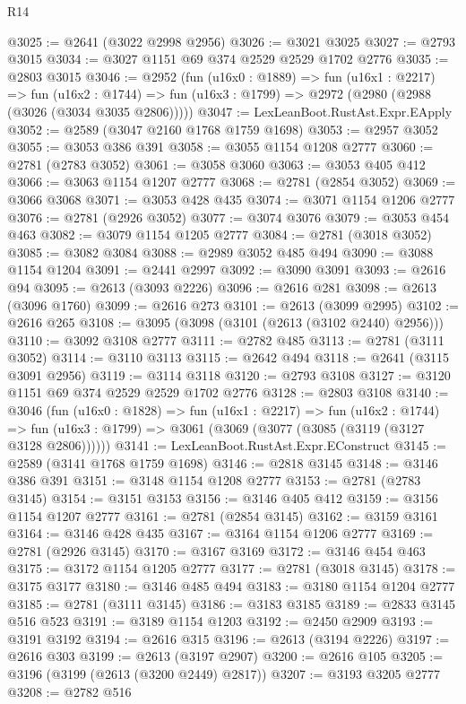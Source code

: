 \begin{lexlean}{R14}
\begin{coremodule}
@3025 := @2641 (@3022 @2998 @2956)
@3026 := @3021 @3025
@3027 := @2793 @3015
@3034 := @3027 @1151 @69 @374 @2529 @2529 @1702 @2776
@3035 := @2803 @3015
@3046 := @2952
    (fun (u16x0 : @1889) =>
    fun (u16x1 : @2217) =>
    fun (u16x2 : @1744) => fun (u16x3 : @1799) => @2972 (@2980 (@2988 (@3026 (@3034 @3035 @2806)))))
@3047 := LexLeanBoot.RustAst.Expr.EApply
@3052 := @2589 (@3047 @2160 @1768 @1759 @1698)
@3053 := @2957 @3052
@3055 := @3053 @386 @391
@3058 := @3055 @1154 @1208 @2777
@3060 := @2781 (@2783 @3052)
@3061 := @3058 @3060
@3063 := @3053 @405 @412
@3066 := @3063 @1154 @1207 @2777
@3068 := @2781 (@2854 @3052)
@3069 := @3066 @3068
@3071 := @3053 @428 @435
@3074 := @3071 @1154 @1206 @2777
@3076 := @2781 (@2926 @3052)
@3077 := @3074 @3076
@3079 := @3053 @454 @463
@3082 := @3079 @1154 @1205 @2777
@3084 := @2781 (@3018 @3052)
@3085 := @3082 @3084
@3088 := @2989 @3052 @485 @494
@3090 := @3088 @1154 @1204
@3091 := @2441 @2997
@3092 := @3090 @3091
@3093 := @2616 @94
@3095 := @2613 (@3093 @2226)
@3096 := @2616 @281
@3098 := @2613 (@3096 @1760)
@3099 := @2616 @273
@3101 := @2613 (@3099 @2995)
@3102 := @2616 @265
@3108 := @3095 (@3098 (@3101 (@2613 (@3102 @2440) @2956)))
@3110 := @3092 @3108 @2777
@3111 := @2782 @485
@3113 := @2781 (@3111 @3052)
@3114 := @3110 @3113
@3115 := @2642 @494
@3118 := @2641 (@3115 @3091 @2956)
@3119 := @3114 @3118
@3120 := @2793 @3108
@3127 := @3120 @1151 @69 @374 @2529 @2529 @1702 @2776
@3128 := @2803 @3108
@3140 := @3046
    (fun (u16x0 : @1828) =>
    fun (u16x1 : @2217) =>
    fun (u16x2 : @1744) =>
    fun (u16x3 : @1799) => @3061 (@3069 (@3077 (@3085 (@3119 (@3127 @3128 @2806))))))
@3141 := LexLeanBoot.RustAst.Expr.EConstruct
@3145 := @2589 (@3141 @1768 @1759 @1698)
@3146 := @2818 @3145
@3148 := @3146 @386 @391
@3151 := @3148 @1154 @1208 @2777
@3153 := @2781 (@2783 @3145)
@3154 := @3151 @3153
@3156 := @3146 @405 @412
@3159 := @3156 @1154 @1207 @2777
@3161 := @2781 (@2854 @3145)
@3162 := @3159 @3161
@3164 := @3146 @428 @435
@3167 := @3164 @1154 @1206 @2777
@3169 := @2781 (@2926 @3145)
@3170 := @3167 @3169
@3172 := @3146 @454 @463
@3175 := @3172 @1154 @1205 @2777
@3177 := @2781 (@3018 @3145)
@3178 := @3175 @3177
@3180 := @3146 @485 @494
@3183 := @3180 @1154 @1204 @2777
@3185 := @2781 (@3111 @3145)
@3186 := @3183 @3185
@3189 := @2833 @3145 @516 @523
@3191 := @3189 @1154 @1203
@3192 := @2450 @2909
@3193 := @3191 @3192
@3194 := @2616 @315
@3196 := @2613 (@3194 @2226)
@3197 := @2616 @303
@3199 := @2613 (@3197 @2907)
@3200 := @2616 @105
@3205 := @3196 (@3199 (@2613 (@3200 @2449) @2817))
@3207 := @3193 @3205 @2777
@3208 := @2782 @516

\end{coremodule}
\end{lexlean}

